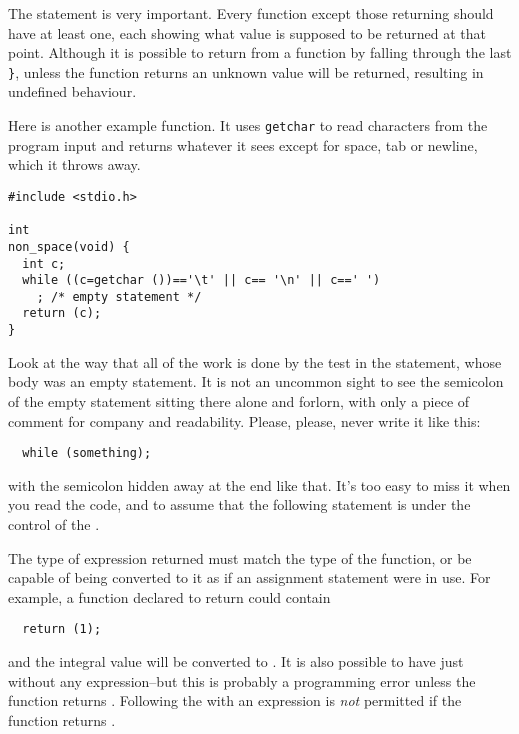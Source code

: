    The \return{} statement is very important. Every function
    except those returning \void{} should have at least one, each
    \return{} showing what value is supposed to be returned at
    that point. Although it is possible to return from a function by falling
    through the last \texttt{\}}, unless the function returns
    \void{} an unknown value will be returned, resulting in
    undefined behaviour.


   Here is another example function. It uses \texttt{getchar} to read
    characters from the program input and returns whatever it sees except
    for space, tab or newline, which it throws away.


\begin{Verbatim}
#include <stdio.h>

int
non_space(void) {
  int c;
  while ((c=getchar ())=='\t' || c== '\n' || c==' ')
    ; /* empty statement */
  return (c);
}
\end{Verbatim}

   Look at the way that all of the work is done by the test in the
    \while{} statement, whose body was an empty statement. It is
    not an uncommon sight to see the semicolon of the empty statement
    sitting there alone and forlorn, with only a piece of comment for
    company and readability. Please, please, never write it like this:

\begin{Verbatim}
  while (something);
\end{Verbatim}

   with the semicolon hidden away at the end like that. It's too easy to
    miss it when you read the code, and to assume that the following
    statement is under the control of the \while.


   The type of expression returned must match the type of the function,
    or be capable of being converted to it as if an assignment statement
    were in use. For example, a function declared to return
    \double{} could contain

\begin{Verbatim}
  return (1);
\end{Verbatim}

   and the integral value will be converted to \double. It is
    also possible to have just \return{} without any
    expression--but this is probably a programming error unless the
    function returns \void. Following the \return{}
    with an expression is \textit{not} permitted if the function returns
    \void.


